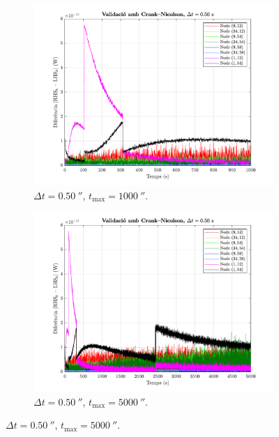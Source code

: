 \begin{figure}[ht]
	\centering
	\begin{subfigure}{.5\textwidth}
		\centering
		\includegraphics[width=.95\linewidth]{imagenes/03_validacio/validacio_01.pdf}
		\vspace{-7pt}
		\caption{$\Delta t = 0.50 \ \second$, $t_\text{max} = 1000 \ \second$.}
		\label{fig:validacio_01}
	\end{subfigure}%
	\begin{subfigure}{.5\textwidth}
		\centering
		\includegraphics[width=.95\linewidth]{imagenes/03_validacio/validacio_02.pdf}
		\vspace{-7pt}
		\caption{$\Delta t = 0.50 \ \second$, $t_\text{max} = 5000 \ \second$.}
		\label{fig:validacio_02}

\end{subfigure}
\end{figure}
